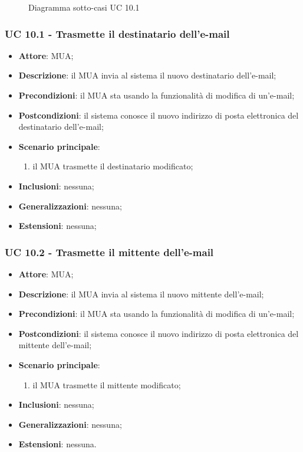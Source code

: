     \begin{figure}[h]
        \centering
        \caption{Diagramma sotto-casi UC 10.1}
    \end{figure}

    \subsubsection{UC 10.1 - Trasmette il destinatario dell'e-mail} \label{sec:UC10.1}
    \begin{itemize}
        \item \textbf{Attore}: MUA;
        \item \textbf{Descrizione}: il MUA invia al sistema il nuovo destinatario dell'e-mail;
        \item \textbf{Precondizioni}: il MUA sta usando la funzionalità di modifica di un'e-mail;
        \item \textbf{Postcondizioni}: il sistema conosce il nuovo indirizzo di posta elettronica del destinatario dell'e-mail;
        \item \textbf{Scenario principale}:
            \begin{enumerate}
                \item il MUA trasmette il destinatario modificato;
            \end{enumerate}
        \item \textbf{Inclusioni}: nessuna;
        \item \textbf{Generalizzazioni}: nessuna;
        \item \textbf{Estensioni}: nessuna;
    \end{itemize}

    \subsubsection{UC 10.2 - Trasmette il mittente dell'e-mail} \label{sec:UC10.2}
    \begin{itemize}
        \item \textbf{Attore}: MUA;
        \item \textbf{Descrizione}: il MUA invia al sistema il nuovo mittente dell'e-mail;
        \item \textbf{Precondizioni}: il MUA sta usando la funzionalità di modifica di un'e-mail;
        \item \textbf{Postcondizioni}: il sistema conosce il nuovo indirizzo di posta elettronica del mittente dell'e-mail;
        \item \textbf{Scenario principale}:
            \begin{enumerate}
                \item il MUA trasmette il mittente modificato;
            \end{enumerate}
        \item \textbf{Inclusioni}: nessuna;
        \item \textbf{Generalizzazioni}: nessuna;
        \item \textbf{Estensioni}: nessuna.
    \end{itemize}

